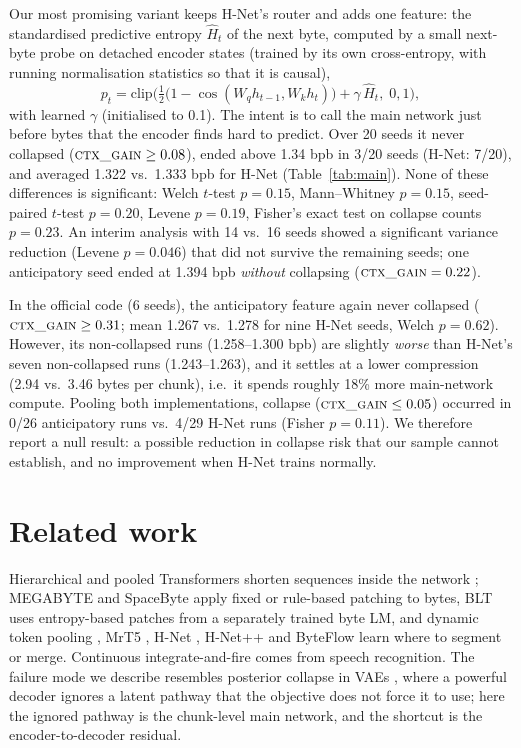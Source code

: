 \documentclass[10pt]{article}
\newcommand{\ctx}{\textsc{ctx\_gain}}
\newcommand{\bpb}{bpb}
\begin{document}
Our most promising variant keeps H-Net's router and adds one feature: the standardised
predictive entropy $\hat H_t$ of the next byte, computed by a small next-byte probe on detached
encoder states (trained by its own cross-entropy, with running normalisation statistics so that
it is causal),
\[
p_t = \mathrm{clip}\Big(\tfrac12\big(1-\cos(W_q h_{t-1}, W_k h_t)\big) + \gamma\,\hat H_t,\; 0, 1\Big),
\]
with learned $\gamma$ (initialised to 0.1). The intent is to call the main network just before
bytes that the encoder finds hard to predict. Over 20 seeds it never collapsed
($\ctx{}\ge0.08$), ended above 1.34 \bpb{} in 3/20 seeds (H-Net: 7/20), and averaged 1.322 vs.\
1.333 \bpb{} for H-Net (Table~\ref{tab:main}). None of these differences is significant: Welch
$t$-test $p=0.15$, Mann--Whitney $p=0.15$, seed-paired $t$-test $p=0.20$, Levene $p=0.19$,
Fisher's exact test on collapse counts $p=0.23$. An interim analysis with 14 vs.\ 16 seeds
showed a significant variance reduction (Levene $p=0.046$) that did not survive the remaining
seeds; one anticipatory seed ended at 1.394 \bpb{} \emph{without} collapsing ($\ctx{}=0.22$).

In the official code (6 seeds), the anticipatory feature again never collapsed
($\ctx{}\ge0.31$; mean 1.267 vs.\ 1.278 for nine H-Net seeds, Welch $p=0.62$). However, its
non-collapsed runs (1.258--1.300 \bpb) are slightly \emph{worse} than H-Net's seven non-collapsed
runs (1.243--1.263), and it settles at a lower compression (2.94 vs.\ 3.46 bytes per chunk), i.e.\
it spends roughly 18\% more main-network compute. Pooling both implementations, collapse
($\ctx{}\le0.05$) occurred in 0/26 anticipatory runs vs.\ 4/29 H-Net runs (Fisher $p=0.11$). We
therefore report a null result: a possible reduction in collapse risk that our sample cannot
establish, and no improvement when H-Net trains normally.

\section{Related work}

Hierarchical and pooled Transformers shorten sequences inside the network
\citep{dai2020funnel,nawrot2021hourglass}; MEGABYTE \citep{yu2023megabyte} and SpaceByte
\citep{slagle2024spacebyte} apply fixed or rule-based patching to bytes, BLT
\citep{pagnoni2024blt} uses entropy-based patches from a separately trained byte LM, and
dynamic token pooling \citep{nawrot2022dtp}, MrT5 \citep{kallini2024mrt5}, H-Net
\citep{hwang2025hnet}, H-Net++ \citep{hnetpp2025} and ByteFlow \citep{byteflow2026} learn where to
segment or merge. Continuous integrate-and-fire \citep{dong2020cif} comes from speech
recognition. The failure mode we describe resembles posterior collapse in VAEs
\citep{bowman2016generating}, where a powerful decoder ignores a latent pathway that the
objective does not force it to use; here the ignored pathway is the chunk-level main network,
and the shortcut is the encoder-to-decoder residual.
\end{document}
